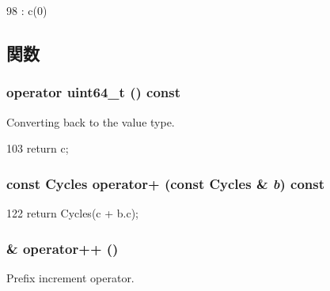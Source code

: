 \begin{DoxyCode}
98 : c(0) { }
\end{DoxyCode}


\subsection{関数}
\hypertarget{classCycles_a6b0df69d39b0e944a8337f52c840be2d}{
\subsubsection[{operator uint64\_\-t}]{\setlength{\rightskip}{0pt plus 5cm}operator uint64\_\-t () const}}
\label{classCycles_a6b0df69d39b0e944a8337f52c840be2d}
Converting back to the value type. 


\begin{DoxyCode}
103 { return c; }
\end{DoxyCode}
\hypertarget{classCycles_a1de47aa3a107127daf93e9ea0822344c}{
\subsubsection[{operator+}]{\setlength{\rightskip}{0pt plus 5cm}const {\bf Cycles} operator+ (const {\bf Cycles} \& {\em b}) const}}
\label{classCycles_a1de47aa3a107127daf93e9ea0822344c}



\begin{DoxyCode}
122     { return Cycles(c + b.c); }
\end{DoxyCode}
\hypertarget{classCycles_a54db4970c7658b61bd48408c3a947f05}{
\subsubsection[{operator++}]{\& operator++ ()}}
\label{classCycles_a54db4970c7658b61bd48408c3a947f05}
Prefix increment operator. 


